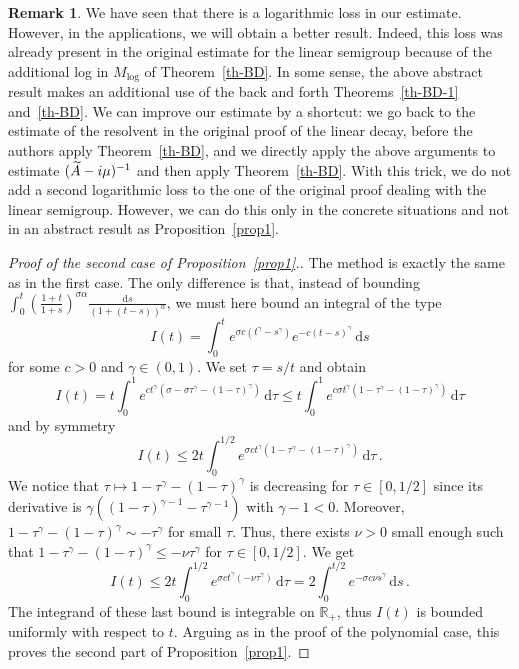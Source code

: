 \documentclass[10pt]{amsart}
\theoremstyle{definition}\newtheorem{defi}[theo]{Definition}\newtheorem{rema}[theo]{Remark}\newtheorem{exam}[theo]{Example}\newtheorem{exem}[theo]{Example}\newtheorem{nota}[theo]{Notation}
\newcommand{\RR}{\mathbb{R}}
\newcommand{\drm}{\mathrm{d}}
\let\oldtilde\tilde
\renewcommand*{\tilde}[1]{\mathchoice{\widetilde{#1}}{\widetilde{#1}}{\oldtilde{#1}}{\oldtilde{#1}}}\let\oldexists\exists
\renewcommand*{\exists}{\mathrel{\oldexists}}
\begin{document}
\begin{rema}\label{remark-log}
We have seen that there is a logarithmic loss in our estimate. However, in the applications, we will obtain a better result. Indeed, this loss was already present in the original estimate for the linear semigroup because of the additional log in $M_{\text{log}}$ of Theorem~\ref{th-BD}. In some sense, the above abstract result makes an additional use of the back and forth Theorems~\ref{th-BD-1} and~\ref{th-BD}. We can improve our estimate by a shortcut: we go back to the estimate of the resolvent in the original proof of the linear decay, before the authors apply Theorem~\ref{th-BD}, and we directly apply the above arguments to estimate $(\tilde A-i\mu)^{-1}$ and then apply Theorem~\ref{th-BD}. With this trick, we do not add a second logarithmic loss to the one of the original proof dealing with the linear semigroup. However, we can do this only in the concrete situations and not in an abstract result as Proposition~\ref{prop1}.
\end{rema}

\begin{proof}[{Proof of the second case of Proposition~\ref{prop1}.}]
The method is exactly the same as in the first case. The only difference is that, instead of bounding $\int_0^t
\left(\frac{1+t}{1+s}\right)^{\sigma\alpha}
\frac{\drm s}{(1+(t-s))^\alpha}$, we must here bound an integral of the type
\[
I(t)=\int_0^t e^{\sigma c(t^\gamma-s^\gamma)}
e^{-c (t-s)^\gamma}\,\drm s
\]
for some $c>0$ and $\gamma \in(0,1)$. We set $\tau=s/t$ and obtain
\[
I(t)=t\int_0^1
e^{c{t^\gamma}(\sigma-\sigma \tau^\gamma-(1-\tau)^\gamma)}\,\drm\tau \leq t\int_0^1 e^{c \sigma t^\gamma(1-\tau^\gamma-(1-\tau)^\gamma)}\,\drm\tau
\]
and by symmetry
\[
I(t)\leq 2t\int_0^{1/2}
e^{ \sigma c t^\gamma(1-{\tau}^\gamma-(1-\tau)^\gamma)}\,\drm\tau\,.
\]
We notice that $\tau\mapsto 1-\tau^\gamma-(1-\tau)^\gamma$ is decreasing for $\tau\in [0,1/2]$ since its derivative is $\gamma((1-\tau)^{\gamma-1}-\tau^{\gamma-1})$ with $\gamma-1 < 0$. Moreover, $1-\tau^\gamma-(1-\tau)^\gamma \sim -\tau^\gamma$ for small $\tau$. Thus, there exists $\nu>0$ small enough such that $1-\tau^\gamma-(1-\tau)^\gamma \leq -\nu \tau^\gamma$ for $\tau\in[0,1/2]$. We get
\[
I(t)\leq 2t\int_0^{1/2} e^{\sigma c t^\gamma (-\nu
\tau^\gamma)}\,\drm\tau= 2\int_0^{t/2} e^{-\sigma c \nu s^\gamma}\,\drm s\,.
\]
The integrand of these last bound is integrable on $\RR_+$, thus $I(t)$ is bounded uniformly with respect to $t$. Arguing as in the proof of the polynomial case, this proves the second part of Proposition~\ref{prop1}. 
\end{proof}
\end{document}
